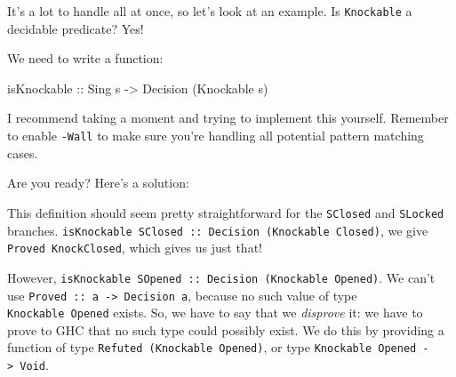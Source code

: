 \documentclass[]{article}
\newenvironment{Shaded}{}{}
\newcommand{\CommentTok}[1]{\textcolor[rgb]{0.38,0.63,0.69}{\textit{#1}}}
\newcommand{\DataTypeTok}[1]{\textcolor[rgb]{0.56,0.13,0.00}{#1}}
\newcommand{\FunctionTok}[1]{\textcolor[rgb]{0.02,0.16,0.49}{#1}}
\newcommand{\KeywordTok}[1]{\textcolor[rgb]{0.00,0.44,0.13}{\textbf{#1}}}
\newcommand{\NormalTok}[1]{#1}
\newcommand{\OtherTok}[1]{\textcolor[rgb]{0.00,0.44,0.13}{#1}}
\begin{document}
It's a lot to handle all at once, so let's look at an example. Is
\texttt{Knockable} a decidable predicate? Yes!

We need to write a function:

\begin{Shaded}
\begin{Highlighting}[]
\OtherTok{isKnockable ::} \DataTypeTok{Sing}\NormalTok{ s }\OtherTok{->} \DataTypeTok{Decision}\NormalTok{ (}\DataTypeTok{Knockable}\NormalTok{ s)}
\end{Highlighting}
\end{Shaded}

I recommend taking a moment and trying to implement this yourself. Remember to
enable \texttt{-Wall} to make sure you're handling all potential pattern
matching cases.

Are you ready? Here's a solution:

\begin{Shaded}
\end{Shaded}

This definition should seem pretty straightforward for the \texttt{SClosed} and
\texttt{SLocked} branches.
\texttt{isKnockable\ SClosed\ ::\ Decision\ (Knockable\ \textquotesingle{}Closed)},
we give \texttt{Proved\ KnockClosed}, which gives us just that!

However,
\texttt{isKnockable\ SOpened\ ::\ Decision\ (Knockable\ \textquotesingle{}Opened)}.
We can't use \texttt{Proved\ ::\ a\ -\textgreater{}\ Decision\ a}, because no
such value of type \texttt{Knockable\ \textquotesingle{}Opened} exists. So, we
have to say that we \emph{disprove} it: we have to prove to GHC that no such
type could possibly exist. We do this by providing a function of type
\texttt{Refuted\ (Knockable\ \textquotesingle{}Opened)}, or type
\texttt{Knockable\ \textquotesingle{}Opened\ -\textgreater{}\ Void}.
\end{document}

